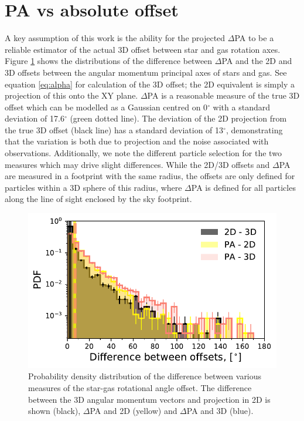 \documentclass[fleqn,usenatbib]{mnras}
\begin{document}
\section{PA vs absolute offset} \label{sec:PA_test}
A key assumption of this work is the ability for the projected $\Delta$PA to be a reliable estimator of the actual 3D offset between star and gas rotation axes. Figure \ref{fig:PA_residual} shows the distributions of the difference between $\Delta$PA and the 2D and 3D offsets between the angular momentum principal axes of stars and gas. See equation \ref{eq:alpha} for calculation of the 3D offset; the 2D equivalent is simply a projection of this onto the XY plane. $\Delta$PA is a reasonable measure of the true 3D offset which can be modelled as a Gaussian centred on 0$^{\circ}$ with a standard deviation of 17.6$^{\circ}$ (green dotted line). The deviation of the 2D projection from the true 3D offset (black line) has a standard deviation of 13$^{\circ}$, demonstrating that the variation is both due to projection and the noise associated with observations. Additionally, we note the different particle selection for the two measures which may drive slight differences. While the 2D/3D offsets and $\Delta$PA are measured in a footprint with the same radius, the offsets are only defined for particles within a 3D sphere of this radius, where $\Delta$PA is defined for all particles along the line of sight enclosed by the sky footprint. 

\begin{figure}
	\includegraphics[width=\linewidth]{tng_appendix/PA_alpha_resid_hist.pdf}
    \caption{Probability density distribution of the difference between various measures of the star-gas rotational angle offset. The difference between the 3D angular momentum vectors and projection in 2D is shown (black), $\Delta$PA and 2D (yellow) and $\Delta$PA and 3D (blue).}
    \label{fig:PA_residual}
\end{figure}


\bsp	%
\label{lastpage}
\end{document}
